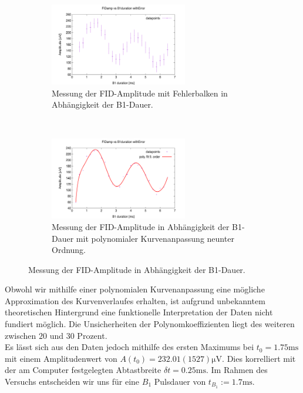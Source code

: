 \documentclass{article}
\begin{document}
            \begin{figure}[H]
                \centering
                \begin{subfigure}[t]{0.45\textwidth}
                    \centering
                    \includegraphics[width=6cm]{../Bilddateien/B1DurationFast_FIDamp_vs_B1duration_withError.png}
                    \caption{Messung der FID-Amplitude mit Fehlerbalken in Abhängigkeit der B1-Dauer.}
                    \label{fig:5:FastFIDampVsB1durationWithError}
                \end{subfigure}
                \
                \begin{subfigure}[t]{0.45\textwidth}
                    \centering
                    \includegraphics[width=6cm]{../Bilddateien/B1DurationFast_FIDamp_vs_B1duration_withError_poly.png}
                    \caption{Messung der FID-Amplitude in Abhängigkeit der B1-Dauer mit polynomialer Kurvenanpassung neunter Ordnung.}
                    \label{fig:5:FastFIDampVsB1duration}
                \end{subfigure}
                \caption{Messung der FID-Amplitude in Abhängigkeit der B1-Dauer.}
            \end{figure}
            Obwohl wir mithilfe einer polynomialen Kurvenanpassung eine mögliche Approximation des Kurvenverlaufes erhalten, ist aufgrund unbekanntem theoretischen Hintergrund eine funktionelle Interpretation der Daten nicht fundiert möglich. Die Unsicherheiten der Polynomkoeffizienten liegt des weiteren zwischen $20$ und $30$ Prozent. \\

            Es lässt sich aus den Daten jedoch mithilfe des ersten Maximums bei $t_0 = 1.75\si{\ms}$ mit einem Amplitudenwert von $A(t_0) = 232.01(1527)\si{\micro\volt}$. Dies korrelliert mit der am Computer festgelegten Abtastbreite $\delta t = 0.25\si{\ms}$. Im Rahmen des Versuchs entscheiden wir uns für eine $B_1$ Pulsdauer von $t_{B_1} := 1.7\si{\ms}$.
\end{document}
